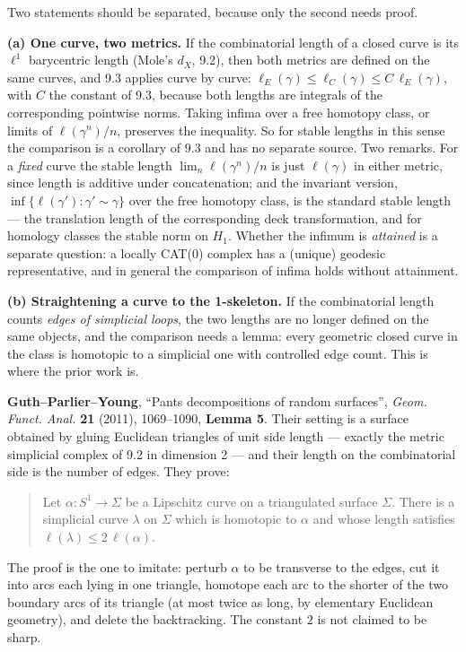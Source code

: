 \documentclass[
]{article}
\begin{document}
Two statements should be separated, because only the second needs proof.

\textbf{(a) One curve, two metrics.} If the combinatorial length of a
closed curve is its \(\ell^1\) barycentric length (Mole's \(d_X\), 9.2),
then both metrics are defined on the same curves, and 9.3 applies curve
by curve: \(\ell_E(\gamma)\le\ell_C(\gamma)\le C\,\ell_E(\gamma)\), with
\(C\) the constant of 9.3, because both lengths are integrals of the
corresponding pointwise norms. Taking infima over a free homotopy class,
or limits of \(\ell(\gamma^n)/n\), preserves the inequality. So for
stable lengths in this sense the comparison is a corollary of 9.3 and
has no separate source. Two remarks. For a \emph{fixed} curve the stable
length \(\lim_n\ell(\gamma^n)/n\) is just \(\ell(\gamma)\) in either
metric, since length is additive under concatenation; and the invariant
version, \(\inf\{\ell(\gamma'):\gamma'\sim\gamma\}\) over the free
homotopy class, is the standard stable length --- the translation length
of the corresponding deck transformation, and for homology classes the
stable norm on \(H_1\). Whether the infimum is \emph{attained} is a
separate question: a locally CAT(0) complex has a (unique) geodesic
representative, and in general the comparison of infima holds without
attainment.

\textbf{(b) Straightening a curve to the 1-skeleton.} If the
combinatorial length counts \emph{edges of simplicial loops}, the two
lengths are no longer defined on the same objects, and the comparison
needs a lemma: every geometric closed curve in the class is homotopic to
a simplicial one with controlled edge count. This is where the prior
work is.

\textbf{Guth--Parlier--Young}, ``Pants decompositions of random
surfaces'', \emph{Geom. Funct. Anal.} \textbf{21} (2011), 1069--1090,
\textbf{Lemma 5}. Their setting is a surface obtained by gluing
Euclidean triangles of unit side length --- exactly the metric
simplicial complex of 9.2 in dimension 2 --- and their length on the
combinatorial side is the number of edges. They prove:

\begin{quote}
Let \(\alpha:S^1\to\Sigma\) be a Lipschitz curve on a triangulated
surface \(\Sigma\). There is a simplicial curve \(\lambda\) on
\(\Sigma\) which is homotopic to \(\alpha\) and whose length satisfies
\(\ell(\lambda)\le2\,\ell(\alpha)\).
\end{quote}

The proof is the one to imitate: perturb \(\alpha\) to be transverse to
the edges, cut it into arcs each lying in one triangle, homotope each
arc to the shorter of the two boundary arcs of its triangle (at most
twice as long, by elementary Euclidean geometry), and delete the
backtracking. The constant \(2\) is not claimed to be sharp.
\end{document}
